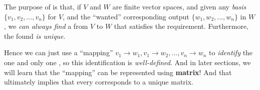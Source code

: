 \begin{remark} \label{remark 2.1.12}
The purpose of  is that, if \(V\) and \(W\) are finite vector spaces, and given any \emph{basis} \(\{ v_1, v_2, ..., v_n \}\) for \(V\), and the ``wanted'' corresponding output \(\{ w_1, w_2, ..., w_n \}\) in \(W\), we \emph{can always find} a \LTRAN{} from \(V\) to \(W\) that satisfies the requirement.
Furthermore, the found \LTRAN{} \emph{is unique}.

Hence we can just use a ``mapping'' \(v_1 \to w_1, v_1 \to w_2, ..., v_n \to w_n\) to \emph{identify} the one and only one \LTRAN{}, so this identification is \emph{well-defined}.
And in later sections, we will learn that the ``mapping'' can be represented using \textbf{matrix}!
And that ultimately implies that every \LTRAN{} corresponds to a unique matrix.
\end{remark}

